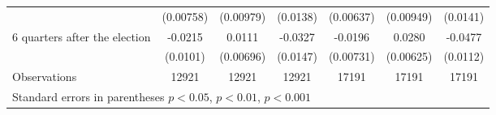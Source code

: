 \begin{table}[!ht]
\begin{tabular}{l*{6}{c}}
                    &   (0.00758)         &   (0.00979)         &    (0.0138)         &   (0.00637)         &   (0.00949)         &    (0.0141)         \\
[0,5em]
 6 quarters after the election&     -0.0215\sym{*}  &      0.0111         &     -0.0327\sym{*}  &     -0.0196\sym{**} &      0.0280\sym{***}&     -0.0477\sym{***}\\
                    &    (0.0101)         &   (0.00696)         &    (0.0147)         &   (0.00731)         &   (0.00625)         &    (0.0112)         \\
\hline
Observations        &       12921         &       12921         &       12921         &       17191         &       17191         &       17191         \\
\hline\hline
\multicolumn{7}{l}{\footnotesize Standard errors in parentheses \sym{*} \(p<0.05\), \sym{**} \(p<0.01\), \sym{***} \(p<0.001\)}\\
\end{tabular}
\end{table}
